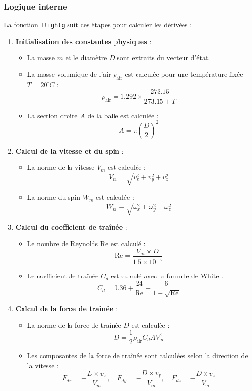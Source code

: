 \documentclass[10pt,a4paper]{report}
\begin{document}
\subsubsection{Logique interne}
La fonction \texttt{flightg} suit ces étapes pour calculer les dérivées :

\begin{enumerate}
    \item \textbf{Initialisation des constantes physiques} :
    \begin{itemize}
        \item La masse \(m\) et le diamètre \(D\) sont extraits du vecteur d'état.
        \item La masse volumique de l'air \(\rho_{\text{air}}\) est calculée pour une température fixée \(T = 20^\circ C\) :
        \[
        \rho_{\text{air}} = 1.292 \times \frac{273.15}{273.15 + T}
        \]
        \item La section droite \(A\) de la balle est calculée :
        \[
        A = \pi \left(\frac{D}{2}\right)^2
        \]
    \end{itemize}

    \item \textbf{Calcul de la vitesse et du spin} :
    \begin{itemize}
        \item La norme de la vitesse \(V_m\) est calculée :
        \[
        V_m = \sqrt{v_x^2 + v_y^2 + v_z^2}
        \]
        \item La norme du spin \(W_m\) est calculée :
        \[
        W_m = \sqrt{\omega_x^2 + \omega_y^2 + \omega_z^2}
        \]
    \end{itemize}

    \item \textbf{Calcul du coefficient de traînée} :
    \begin{itemize}
        \item Le nombre de Reynolds \(\text{Re}\) est calculé :
        \[
        \text{Re} = \frac{V_m \times D}{1.5 \times 10^{-5}}
        \]
        \item Le coefficient de traînée \(C_d\) est calculé avec la formule de White :
        \[
        C_d = 0.36 + \frac{24}{\text{Re}} + \frac{6}{1 + \sqrt{\text{Re}}}
        \]
    \end{itemize}

    \item \textbf{Calcul de la force de traînée} :
    \begin{itemize}
        \item La norme de la force de traînée \(D\) est calculée :
        \[
        D = \frac{1}{2} \rho_{\text{air}} C_d A V_m^2
        \]
        \item Les composantes de la force de traînée sont calculées selon la direction de la vitesse :
        \[
        F_{dx} = -\frac{D \times v_x}{V_m}, \quad F_{dy} = -\frac{D \times v_y}{V_m}, \quad F_{dz} = -\frac{D \times v_z}{V_m}
        \]
    \end{itemize}


\end{enumerate}
\end{document}
